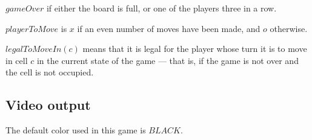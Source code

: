 \documentclass{led_doc}
\begin{document}
\begin{ledCmnt}
$gameOver$ if either the board is full, or one of the players three in a row.
\end{ledCmnt}

\begin{ledDef}
\end{ledDef}

\begin{ledCmnt}
$playerToMove$ is $x$ if an even number of moves have been made, and $o$ otherwise.
\end{ledCmnt}

\begin{ledDef}
\end{ledDef}

\begin{ledDef}
\end{ledDef}

\begin{ledCmnt}
$legalToMoveIn(c)$ means that it is legal for the player whose
turn it is to move in cell $c$ in the current state of the game ---
that is, if the game is not over and the cell is not occupied.
\end{ledCmnt}

\begin{ledDef}
\end{ledDef}

\begin{ledCmnt}
\section{Video output}

The default color used in this game is $BLACK$.
\end{ledCmnt}

\begin{ledDef}
\end{ledDef}

\begin{ledDef}
\end{ledDef}
\end{document}
